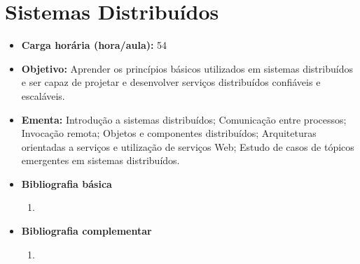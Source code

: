 \documentclass[
	10pt,				%
	openright,			%
	twoside,			%
	a4paper,			%
	english,			%
	french,				%
	brazil,				%
	sumario=tradicional
]{abntex2}
\begin{document}
\section*{Sistemas Distribuídos}\label{5_sd}
\begin{itemize}
	\item \textbf{Carga horária (hora/aula):} 54
	\item \textbf{Objetivo:} Aprender os princípios básicos utilizados em sistemas distribuídos e ser capaz de projetar e desenvolver serviços distribuídos confiáveis e escaláveis.
	\item \textbf{Ementa:} 
	Introdução a sistemas distribuídos; 
	Comunicação entre processos; 
	Invocação remota; 
	Objetos e componentes distribuídos; 
	Arquiteturas orientadas a serviços e utilização de serviços Web;  
	Estudo de casos de tópicos emergentes em sistemas distribuídos.
	\item \textbf{Bibliografia básica}
	\begin{enumerate}
		\item 
	\end{enumerate}
	\item \textbf{Bibliografia complementar}
	\begin{enumerate}
		\item 	
	\end{enumerate}	
\end{itemize}


\newpage
\end{document}
